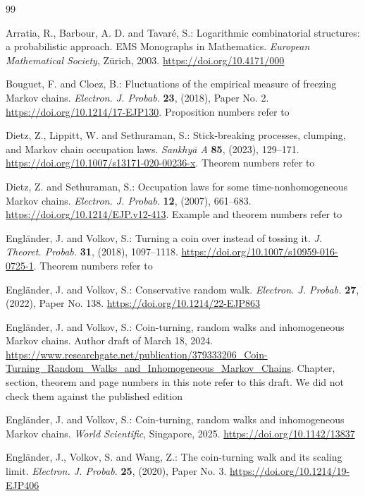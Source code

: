 \begin{thebibliography}{99}

 Arratia, R., Barbour, A. D. and Tavar\'e, S.: Logarithmic
  combinatorial structures: a probabilistic approach. EMS Monographs in
  Mathematics. \emph{European Mathematical Society}, Z\"urich, 2003.
  \url{https://doi.org/10.4171/000}

 Bouguet, F. and Cloez, B.: Fluctuations of the empirical
  measure of freezing Markov chains. \emph{Electron. J. Probab.} \textbf{23},
  (2018), Paper No. 2. \url{https://doi.org/10.1214/17-EJP130}. Proposition
  numbers refer to 

 Dietz, Z., Lippitt, W. and Sethuraman, S.: Stick-breaking
  processes, clumping, and Markov chain occupation laws. \emph{Sankhy\=a A}
  \textbf{85}, (2023), 129--171.
  \url{https://doi.org/10.1007/s13171-020-00236-x}. Theorem numbers refer to

 Dietz, Z. and Sethuraman, S.: Occupation laws for some
  time-nonhomogeneous Markov chains. \emph{Electron. J. Probab.} \textbf{12},
  (2007), 661--683. \url{https://doi.org/10.1214/EJP.v12-413}. Example and
  theorem numbers refer to 

 Engl\"ander, J. and Volkov, S.: Turning a coin over instead of
  tossing it. \emph{J. Theoret. Probab.} \textbf{31}, (2018), 1097--1118.
  \url{https://doi.org/10.1007/s10959-016-0725-1}. Theorem numbers refer to

 Engl\"ander, J. and Volkov, S.: Conservative random walk.
  \emph{Electron. J. Probab.} \textbf{27}, (2022), Paper No. 138.
  \url{https://doi.org/10.1214/22-EJP863}

 Engl\"ander, J. and Volkov, S.: Coin-turning, random walks and
  inhomogeneous Markov chains. Author draft of March 18, 2024.
  \url{https://www.researchgate.net/publication/379333206_Coin-Turning_Random_Walks_and_Inhomogeneous_Markov_Chains}.
  Chapter, section, theorem and page numbers in this note refer to this draft.
  We did not check them against the published edition~\cite{ev2025}

 Engl\"ander, J. and Volkov, S.: Coin-turning, random walks and
  inhomogeneous Markov chains. \emph{World Scientific}, Singapore, 2025.
  \url{https://doi.org/10.1142/13837}

 Engl\"ander, J., Volkov, S. and Wang, Z.: The coin-turning
  walk and its scaling limit. \emph{Electron. J. Probab.} \textbf{25}, (2020),
  Paper No. 3. \url{https://doi.org/10.1214/19-EJP406}


\end{thebibliography}
